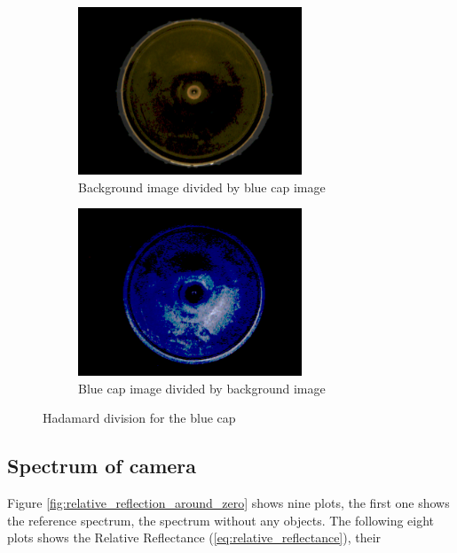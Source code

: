 \begin{figure}[h]
    \begin{subfigure}{0.5\textwidth}
        \includegraphics[width=0.9\linewidth, height=5cm]{figures/processed_camera_pictures/002_blue_cap_negative_difference.png} 
        \caption{Background image divided by blue cap image}
        \label{fig:002_blue_cap_negative_difference}
        \end{subfigure}%
        \begin{subfigure}{0.5\textwidth}
        \includegraphics[width=0.9\linewidth, height=5cm]{figures/processed_camera_pictures/002_blue_cap_positive_difference.png}
        \caption{Blue cap image divided by background image}
        \label{fig:002_blue_cap_positive_difference}
    \end{subfigure}
    
    \caption{Hadamard division for the blue cap}
    \label{fig:hadamard_division_blue_cap}
\end{figure}


\subsection{Spectrum of camera}
Figure \ref{fig:relative_reflection_around_zero} shows nine plots, the first one shows the reference spectrum, the spectrum without any objects. The following eight plots shows the Relative Reflectance (\ref{eq:relative_reflectance}), their 

